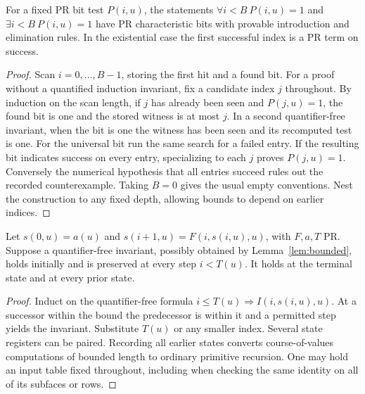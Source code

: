 \begin{lemma}\label{lem:bounded}\label{idx-arithmetic9}
For a fixed PR bit test $P(i,u)$, the statements $\forall i<B\ P(i,u)=1$ and $\exists i<B\ P(i,u)=1$ have PR characteristic bits with provable introduction and elimination rules. In the existential case the first successful index is a PR term on success.
\end{lemma}
\begin{proof}
Scan $i=0,\ldots,B-1$, storing the first hit and a found bit. For a proof without a quantified induction invariant, fix a candidate index $j$ throughout. By induction on the scan length, if $j$ has already been seen and $P(j,u)=1$, the found bit is one and the stored witness is at most $j$. In a second quantifier-free invariant, when the bit is one the witness has been seen and its recomputed test is one. For the universal bit run the same search for a failed entry. If the resulting bit indicates success on every entry, specializing to each $j$ proves $P(j,u)=1$. Conversely the numerical hypothesis that all entries succeed rules out the recorded counterexample. Taking $B=0$ gives the usual empty conventions. Nest the construction to any fixed depth, allowing bounds to depend on earlier indices.
\end{proof}

\begin{proposition}\label{prop:loops}\label{idx-arithmetic16}
Let $s(0,u)=a(u)$ and $s(i+1,u)=F(i,s(i,u),u)$, with $F,a,T$ PR. Suppose a quantifier-free invariant, possibly obtained by Lemma~\ref{lem:bounded}, holds initially and is preserved at every step $i<T(u)$. It holds at the terminal state and at every prior state.
\end{proposition}
\begin{proof}
Induct on the quantifier-free formula $i\le T(u)\Rightarrow I(i,s(i,u),u)$. At a successor within the bound the predecessor is within it and a permitted step yields the invariant. Substitute $T(u)$ or any smaller index. Several state registers can be paired. Recording all earlier states converts course-of-values computations of bounded length to ordinary primitive recursion. One may hold an input table fixed throughout, including when checking the same identity on all of its subfaces or rows.
\end{proof}

